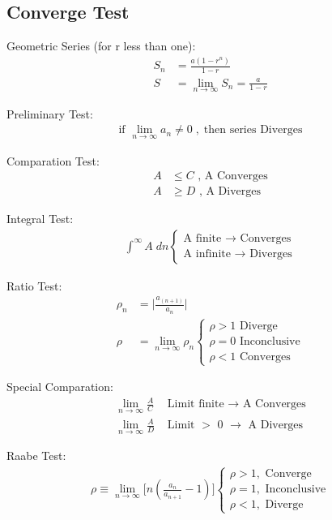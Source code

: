 \documentclass[../../../main.tex]{subfiles}
\begin{document}
\subsection{Converge Test}
Geometric Series (for r less than one):
\begin{align*}
    S_n & =\frac{a(1-r^n)}{1-r}                  \\
    S   & =\lim_{n \to \infty} S_n=\frac{a}{1-r}
\end{align*}

Preliminary Test:
\begin{align*}
    \text{if }\lim_{n \to \infty} a_n \neq 0\;,\;\text{then series Diverges}
\end{align*}

Comparation Test:
\begin{align*}
    A & \leq C\text{ , A Converges} \\
    A & \geq D\text{ , A Diverges}
\end{align*}

Integral Test:
\begin{align*}
    \int_{}^{\infty} A\;dn
    \begin{cases}
        \text{A finite $\rightarrow$ Converges} \\
        \text{A infinite $\rightarrow$ Diverges}
    \end{cases}
\end{align*}

Ratio Test:
\begin{align*}
    \rho_n & =\bigg \lvert \frac{a_{(n+1)}}{a_n} \bigg \rvert \\
    \rho   & =\lim_{n\to \infty} \rho_n
    \begin{cases}
        \rho > 1 \text{ Diverge}      \\
        \rho = 0 \text{ Inconclusive} \\
        \rho < 1 \text{ Converges}
    \end{cases}
\end{align*}

Special Comparation:
\begin{align*}
    \lim_{n\to \infty} \frac{A}{C} & \text{ Limit finite $\rightarrow$ A Converges} \\
    \lim_{n\to \infty} \frac{A}{D} & \text{ Limit $>$ 0 $\rightarrow$ A Diverges}
\end{align*}

Raabe Test:
\begin{align*}
    \rho\equiv\lim_{n\to \infty} \bigg[n(\frac{a_n}{a_{n+1}}-1)\bigg]\begin{cases}
                                                                         \rho > 1,\textrm{ Converge} \\\rho = 1,\textrm{ Inconclusive}\\\rho < 1,\textrm{ Diverge}
                                                                     \end{cases}
\end{align*}
\end{document}
